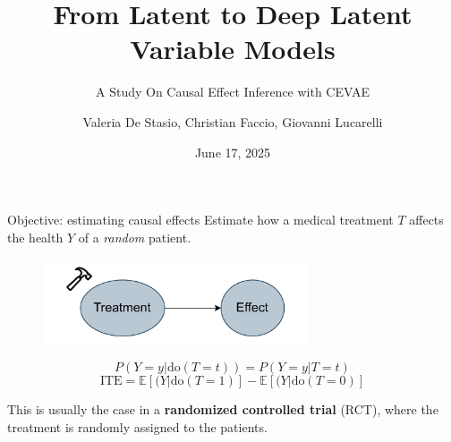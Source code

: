 \documentclass[10pt]{beamer}
\title{From Latent to Deep Latent Variable Models}
\subtitle{A Study On Causal Effect Inference with CEVAE}
\date{June 17, 2025}
\author[longname]{Valeria De Stasio, Christian Faccio, Giovanni Lucarelli}
\begin{document}
\maketitle

\begin{frame}{Objective: estimating causal effects}
    Estimate how a medical treatment $T$ affects the health $Y$ of a \textit{random} patient.
  \begin{figure}
    \centering
    \includegraphics[width=0.7\textwidth]{images/no_confounders.pdf}
  \end{figure}

  \begin{equation*}
    P(Y=y|\text{do}(T=t))=P(Y=y|T=t)
  \end{equation*}
  \begin{equation*}
    \text{ITE} = \mathbb{E}[(Y|\text{do}(T=1)]-\mathbb{E}[(Y|\text{do}(T=0)]
  \end{equation*}
  
  This is usually the case in a \textbf{randomized controlled trial} (RCT), where the treatment is randomly assigned to the patients.

\end{frame}
\end{document}
